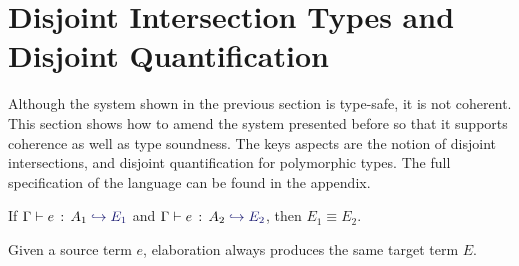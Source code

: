 \section{Disjoint Intersection Types and Disjoint Quantification}


Although the system shown in the previous section is type-safe, it is not
coherent.  This section shows how to amend the system presented before so that
it supports coherence as well as type soundness. The keys aspects are the notion
of disjoint intersections, and disjoint quantification for polymorphic types.
The full specification of the language can be found in the appendix.

\begin{theorem} \label{unique-elaboration}

  If $\hastype \Gamma e {A_1} \yields {E_1}$ and $\hastype \Gamma e {A_2}
  \yields {E_2}$, then $E_1 \equiv E_2$.

\end{theorem}

Given a source term $e$, elaboration always produces the same target term $E$.

%

%
%
%


